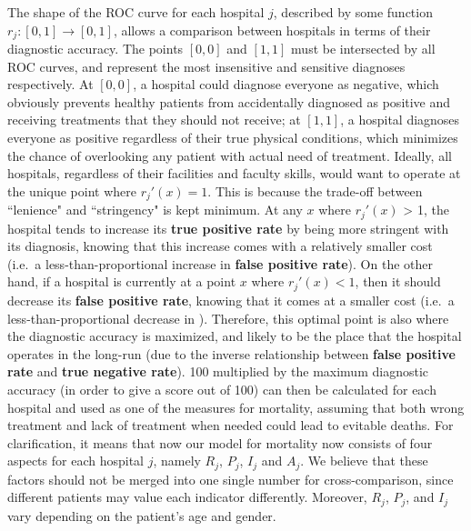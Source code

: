 \documentclass{article}
\begin{document}
The shape of the ROC curve for each hospital $j$, described by some function $r_j : [0,1] \to [0,1]$, allows a comparison between hospitals in terms of their diagnostic accuracy. The points $[0,0]$ and $[1,1]$ must be intersected by all ROC curves, and represent the most insensitive and sensitive diagnoses respectively. At $[0,0]$, a hospital could diagnose everyone as negative, which obviously prevents healthy patients from accidentally diagnosed as positive and receiving treatments that they should not receive; at $[1,1]$, a hospital diagnoses everyone as positive regardless of their true physical conditions, which minimizes the chance of overlooking any patient with actual need of treatment. Ideally, all hospitals, regardless of their facilities and faculty skills, would want to operate at the unique point where $r_j'(x) = 1$. This is because the trade-off between ``lenience" and ``stringency" is kept minimum. At any $x$ where $r_j'(x)$ > 1, the hospital tends to increase its \textbf{true positive rate} by being more stringent with its diagnosis, knowing that this increase comes with a relatively smaller cost (i.e.\ a less-than-proportional increase in \textbf{false positive rate}). On the other hand, if a hospital is currently at a point $x$ where $r_j'(x) < 1$, then it should decrease its \textbf{false positive rate}, knowing that it comes at a smaller cost (i.e.\ a less-than-proportional decrease in ). Therefore, this optimal point is also where the diagnostic accuracy is maximized, and likely to be the place that the hospital operates in the long-run (due to the inverse relationship between \textbf{false positive rate} and \textbf{true negative rate}). 100 multiplied by the maximum diagnostic accuracy (in order to give a score out of 100) can then be calculated for each hospital and used as one of the measures for mortality, assuming that both wrong treatment and lack of treatment when needed could lead to evitable deaths. For clarification, it means that now our model for mortality now consists of four aspects for each hospital $j$, namely $R_j$, $P_j$, $I_j$ and $A_j$. We believe that these factors should not be merged into one single number for cross-comparison, since different patients may value each indicator differently. Moreover, $R_j$, $P_j$, and $I_j$ vary depending on the patient's age and gender.
\end{document}
